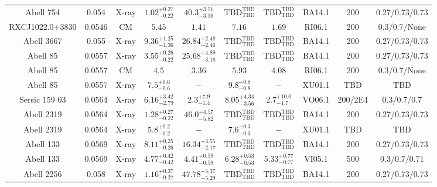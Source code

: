 \begin{table}
\begin{tabular}{cccccccccc}
Abell 754 & 0.054 & X-ray & ${1.02}^{+0.27}_{-0.22}$ & ${40.3}^{+3.71}_{-3.16}$ & ${\mathrm{TBD}}^{\mathrm{TBD}}_{\mathrm{TBD}}$ & ${\mathrm{TBD}}^{\mathrm{TBD}}_{\mathrm{TBD}}$ & BA14.1 & 200 & 0.27/0.73/0.73 \\
RXCJ1022.0+3830 & 0.0546 & CM & ${5.45}^{}_{}$ & ${1.41}^{}_{}$ & ${7.16}^{}_{}$ & ${1.69}^{}_{}$ & RI06.1 & 200 & 0.3/0.7/None \\
Abell 3667 & 0.055 & X-ray & ${9.36}^{+1.25}_{-1.36}$ & ${26.84}^{+2.48}_{-2.46}$ & ${\mathrm{TBD}}^{\mathrm{TBD}}_{\mathrm{TBD}}$ & ${\mathrm{TBD}}^{\mathrm{TBD}}_{\mathrm{TBD}}$ & BA14.1 & 200 & 0.27/0.73/0.73 \\
Abell 85 & 0.0557 & X-ray & ${3.55}^{+0.26}_{-0.22}$ & ${25.68}^{+4.89}_{-3.18}$ & ${\mathrm{TBD}}^{\mathrm{TBD}}_{\mathrm{TBD}}$ & ${\mathrm{TBD}}^{\mathrm{TBD}}_{\mathrm{TBD}}$ & BA14.1 & 200 & 0.27/0.73/0.73 \\
Abell 85 & 0.0557 & CM & ${4.5}^{}_{}$ & ${3.36}^{}_{}$ & ${5.93}^{}_{}$ & ${4.08}^{}_{}$ & RI06.1 & 200 & 0.3/0.7/None \\
Abell 85 & 0.0557 & X-ray & ${7.5}^{+0.6}_{-0.6}$ & ${-}^{}_{}$ & ${9.8}^{+0.8}_{-0.8}$ & ${-}^{}_{}$ & XU01.1 & TBD & TBD \\
Sersic 159 03 & 0.0564 & X-ray & ${6.16}^{+3.42}_{-2.79}$ & ${2.3}^{+7.9}_{-1.4}$ & ${8.05}^{+4.34}_{-3.56}$ & ${2.7}^{+10.0}_{-1.7}$ & VO06.1 & 200/2E4 & 0.3/0.7/0.7 \\
Abell 2319 & 0.0564 & X-ray & ${1.28}^{+0.27}_{-0.22}$ & ${46.0}^{+4.57}_{-5.82}$ & ${\mathrm{TBD}}^{\mathrm{TBD}}_{\mathrm{TBD}}$ & ${\mathrm{TBD}}^{\mathrm{TBD}}_{\mathrm{TBD}}$ & BA14.1 & 200 & 0.27/0.73/0.73 \\
Abell 2319 & 0.0564 & X-ray & ${5.8}^{+0.2}_{-0.2}$ & ${-}^{}_{}$ & ${7.6}^{+0.3}_{-0.3}$ & ${-}^{}_{}$ & XU01.1 & TBD & TBD \\
Abell 133 & 0.0569 & X-ray & ${8.11}^{+0.25}_{-0.26}$ & ${16.34}^{+3.55}_{-2.17}$ & ${\mathrm{TBD}}^{\mathrm{TBD}}_{\mathrm{TBD}}$ & ${\mathrm{TBD}}^{\mathrm{TBD}}_{\mathrm{TBD}}$ & BA14.1 & 200 & 0.27/0.73/0.73 \\
Abell 133 & 0.0569 & X-ray & ${4.77}^{+0.42}_{-0.42}$ & ${4.41}^{+0.59}_{-0.59}$ & ${6.28}^{+0.53}_{-0.53}$ & ${5.33}^{+0.77}_{-0.77}$ & VI05.1 & 500 & 0.3/0.7/0.71 \\
Abell 2256 & 0.058 & X-ray & ${1.16}^{+0.37}_{-0.27}$ & ${47.78}^{+5.37}_{-5.29}$ & ${\mathrm{TBD}}^{\mathrm{TBD}}_{\mathrm{TBD}}$ & ${\mathrm{TBD}}^{\mathrm{TBD}}_{\mathrm{TBD}}$ & BA14.1 & 200 & 0.27/0.73/0.73 \\

\end{tabular}
\end{table}
